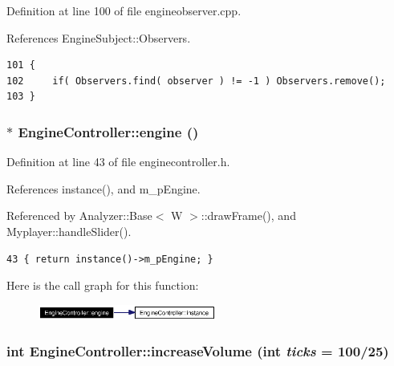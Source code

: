 Definition at line 100 of file engineobserver.cpp.

References Engine\-Subject::Observers.



\footnotesize\begin{verbatim}101 {
102     if( Observers.find( observer ) != -1 ) Observers.remove();
103 }
\end{verbatim}\normalsize 
{}
\subsubsection{$\ast$ Engine\-Controller::engine ()\hspace{0.3cm}{\tt  [inline, static]}}\label{classEngineController_EngineControllere1}




Definition at line 43 of file enginecontroller.h.

References instance(), and m\_\-p\-Engine.

Referenced by Analyzer::Base$<$ W $>$::draw\-Frame(), and Myplayer::handle\-Slider().



\footnotesize\begin{verbatim}43 { return instance()->m_pEngine; }
\end{verbatim}\normalsize 


Here is the call graph for this function:\begin{figure}[H]
\begin{center}
\leavevmode
\includegraphics[width=166pt]{classEngineController_EngineControllere1_cgraph}
\end{center}
\end{figure}
\subsubsection{\setlength{\rightskip}{0pt plus 5cm}int Engine\-Controller::increase\-Volume (int {\em ticks} = 100/25)\hspace{0.3cm}{\tt  [slot]}}\label{classEngineController_EngineControlleri7}




